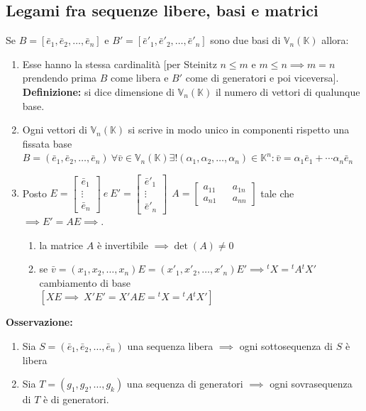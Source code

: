 \documentclass{article}
\newcommand{\s}[2]{#1_1, #1_2, \ldots, #1_{#2}}
\newcommand{\Vx}[1]{\mathbb{V}_#1 (\mathbb{K})}
\newcommand{\ah}{\alpha}
\begin{document}
\subsection{Legami fra sequenze libere, basi e matrici}
Se $B=[\s{\bar{e}}{n}]$ e $B'=[\s{\bar{e}'}{n}]$ sono due basi di $\Vx{n}$
allora:
\begin{enumerate}
    \item Esse hanno la stessa cardinalità [per Steinitz $n\leq m$ e $m\leq n \implies m
              = n$ prendendo prima $B$ come libera e $B'$ come di generatori e poi
          viceversa].\\ \textbf{Definizione:} si dice dimensione di $\Vx{n}$ il numero di
          vettori di qualunque base.
    \item Ogni vettori di $\Vx{n}$ si scrive in modo unico in componenti rispetto una
          fissata base \\ $B=(\s{\bar e}{n})\ \forall\bar v\in \Vx{n}\exists
              !(\s{\ah}{n})\in\mathbb{K}^n:\bar v = \ah_1\bar e_1+\cdots\ah_n\bar e_n$
    \item Posto $ E = \begin{bmatrix}\bar e_1 \\ \vdots \\ \bar e_n\end{bmatrix} \ e \ E'=\begin{bmatrix}\bar e'_1 \\ \vdots \\ \bar e'_n\end{bmatrix} \ \ A=\begin{bmatrix}a_{11} && a_{1n} \\ a_{n1} && a_{nn} \end{bmatrix}$ tale che $\implies E'=AE\implies$.
          \begin{enumerate}
              \item la matrice $A$ è invertibile $\implies \det(A)\ne0$
              \item se $\bar v=(\s{x}{n})E=(\s{x'}{n})E'\implies {^{t}X} = {^{t}A}{^{t}X'}$
                    cambiamento di base \\$[XE\implies\ X'E'=X'AE={^{t}X}={^{t}A}{^{t}X'}]$
          \end{enumerate}
\end{enumerate}
\textbf{Osservazione:}\begin{enumerate}
    \item Sia $S= (\s{\bar{e}}{n})$ una sequenza libera $\implies$ ogni sottosequenza di
          $S$ è libera
    \item Sia $T= (\s{g}{k})$ una sequenza di generatori $\implies$ ogni sovrasequenza di
          $T$ è di generatori.
\end{enumerate}
\end{document}

